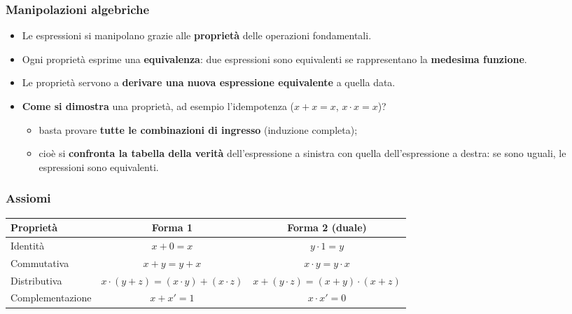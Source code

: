 \documentclass[12pt, a4paper]{article}
\begin{document}
\subsubsection{Manipolazioni algebriche}
\begin{itemize}
    \item Le espressioni si manipolano grazie alle \textbf{proprietà} delle operazioni fondamentali.
    \item Ogni proprietà esprime una \textbf{equivalenza}: due espressioni sono equivalenti se rappresentano la \textbf{medesima funzione}.
    \item Le proprietà servono a \textbf{derivare una nuova espressione equivalente} a quella data.
    \item \textbf{Come si dimostra} una proprietà, ad esempio l'idempotenza ($x + x = x$, $x \cdot x = x$)?
    \begin{itemize}
        \item basta provare \textbf{tutte le combinazioni di ingresso} (induzione completa);
        \item cioè si \textbf{confronta la tabella della verità} dell'espressione a sinistra con quella dell'espressione a destra: se sono uguali, le espressioni sono equivalenti.
    \end{itemize}
\end{itemize}

\subsubsection{Assiomi}
\begin{center}
\renewcommand{\arraystretch}{1.35}
\begin{tabular}{|l|c|c|}
\hline
\colorbox{gray!25}{\color{black}\textbf{Proprietà}} & \colorbox{gray!25}{\color{black}\textbf{Forma 1}} & \colorbox{gray!25}{\color{black}\textbf{Forma 2 (duale)}} \\ \hline
Identità & $x + 0 = x$ & $y \cdot 1 = y$ \\ \hline
Commutativa & $x + y = y + x$ & $x \cdot y = y \cdot x$ \\ \hline
Distributiva & $x \cdot (y + z) = (x \cdot y) + (x \cdot z)$ & $x + (y \cdot z) = (x + y) \cdot (x + z)$ \\ \hline
Complementazione & $x + x' = 1$ & $x \cdot x' = 0$ \\ \hline
\end{tabular}
\end{center}
\end{document}
